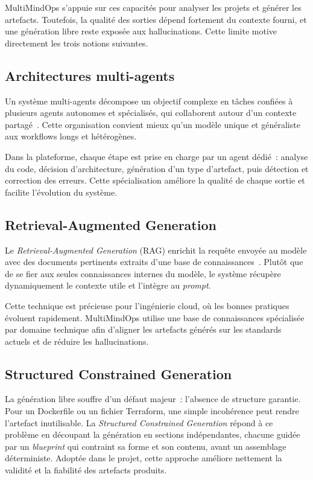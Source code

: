 MultiMindOps s'appuie sur ces capacités pour analyser les projets et générer les artefacts.
Toutefois, la qualité des sorties dépend fortement du contexte fourni, et une génération
libre reste exposée aux hallucinations. Cette limite motive directement les trois notions
suivantes.

\subsection{Architectures multi-agents}

Un système multi-agents décompose un objectif complexe en tâches confiées à plusieurs agents
autonomes et spécialisés, qui collaborent autour d'un contexte partagé~\cite{LANGGRAPH}.
Cette organisation convient mieux qu'un modèle unique et généraliste aux workflows longs et
hétérogènes.

Dans la plateforme, chaque étape est prise en charge par un agent dédié~: analyse du code,
décision d'architecture, génération d'un type d'artefact, puis détection et correction des
erreurs. Cette spécialisation améliore la qualité de chaque sortie et facilite l'évolution
du système.

\subsection{Retrieval-Augmented Generation}

Le \textit{Retrieval-Augmented Generation} (RAG) enrichit la requête envoyée au modèle avec
des documents pertinents extraits d'une base de connaissances~\cite{RAG_LEWIS}. Plutôt que
de se fier aux seules connaissances internes du modèle, le système récupère dynamiquement le
contexte utile et l'intègre au \textit{prompt}.

Cette technique est précieuse pour l'ingénierie cloud, où les bonnes pratiques évoluent
rapidement. MultiMindOps utilise une base de connaissances spécialisée par domaine technique
afin d'aligner les artefacts générés sur les standards actuels et de réduire les
hallucinations.

\subsection{Structured Constrained Generation}

La génération libre souffre d'un défaut majeur~: l'absence de structure garantie. Pour un
Dockerfile ou un fichier Terraform, une simple incohérence peut rendre l'artefact
inutilisable. La \textit{Structured Constrained Generation} répond à ce problème en
découpant la génération en sections indépendantes, chacune guidée par un \textit{blueprint}
qui contraint sa forme et son contenu, avant un assemblage déterministe. Adoptée dans le
projet, cette approche améliore nettement la validité et la fiabilité des artefacts produits.

